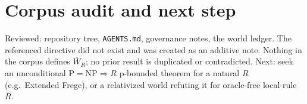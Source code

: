 \documentclass{article}\usepackage{amsmath,amssymb,amsthm}
\begin{document}
\section{Corpus audit and next step}
Reviewed: repository tree, \texttt{AGENTS.md}, governance notes, the world ledger. The referenced directive did not exist and was created as an additive note. Nothing in the corpus defines $\overline W_R$; no prior result is duplicated or contradicted. Next: seek an unconditional $\mathrm P=\mathrm{NP}\Rightarrow R$ p-bounded theorem for a natural $R$ (e.g.\ Extended Frege), or a relativized world refuting it for oracle-free local-rule $R$.
\end{document}
